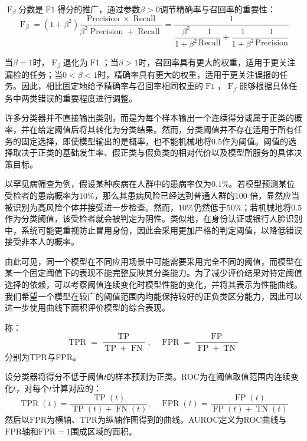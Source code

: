 \begin{definition}
	$\operatorname{F}_{\beta}$分数是$\operatorname{F1}$得分的推广，通过参数$\beta>0$调节精确率与召回率的重要性：
	\begin{equation*}
		\operatorname{F}_{\beta}=(1+\beta^2)\frac{\operatorname{Precision}\times\operatorname{Recall}}{\beta^2\operatorname{Precision}+\operatorname{Recall}}=\dfrac{1}{\dfrac{\beta^2}{1+\beta^2}\dfrac{1}{\operatorname{Recall}}+\dfrac{1}{1+\beta^2}\dfrac{1}{\operatorname{Precision}}}
	\end{equation*}
\end{definition}
\begin{note}
	当$\beta=1$时，$\operatorname{F}_{\beta}$退化为$\operatorname{F1}$；当$\beta>1$时，召回率具有更大的权重，适用于更关注漏检的任务；当$0<\beta<1$时，精确率具有更大的权重，适用于更关注误报的任务。因此，相比固定地给予精确率与召回率相同权重的$\operatorname{F1}$，$\operatorname{F}_{\beta}$能够根据具体任务中两类错误的重要程度进行调整。
\end{note}
许多分类器并不直接输出类别，而是为每个样本输出一个连续得分或属于正类的概率，并在给定阈值后将其转化为分类结果。然而，分类阈值并不存在适用于所有任务的固定选择，即使模型输出的是概率，也不能机械地将$0.5$作为阈值。阈值的选择取决于正类的基础发生率、假正类与假负类的相对代价以及模型所服务的具体决策目标。\par
以罕见病筛查为例，假设某种疾病在人群中的患病率仅为$0.1\%$。若模型预测某位受检者的患病概率为$10\%$，那么其患病风险已经达到普通人群的$100$ 倍，显然应当被识别为高风险个体并接受进一步检查。然而，$10\%$仍然低于$50\%$；若机械地将$0.5$作为分类阈值，该受检者就会被判定为阴性。类似地，在身份认证或银行人脸识别中，系统可能更重视防止冒用身份，因此会采用更加严格的判定阈值，以降低错误接受非本人的概率。\par
由此可见，同一个模型在不同应用场景中可能需要采用完全不同的阈值，而模型在某一个固定阈值下的表现不能完整反映其分类能力。为了减少评价结果对特定阈值选择的依赖，可以考察阈值连续变化时模型性能的变化，并将其表示为性能曲线。我们希望一个模型在较广的阈值范围内均能保持较好的正负类区分能力，因此可以进一步使用曲线下面积评价模型的综合表现。
\begin{definition}
	称：
	 \begin{equation*}
		\operatorname{TPR}=\frac{\operatorname{TP}}{\operatorname{TP}+\operatorname{FN}},\quad\operatorname{FPR}=\frac{\operatorname{FP}}{\operatorname{FP}+\operatorname{TN}}
	\end{equation*}
	分别为\gls{TPR}与\gls{FPR}。
\end{definition}
\begin{definition}
	设分类器将得分不低于阈值$t$的样本预测为正类。\gls{ROC}为在阈值取值范围内连续变化$t$，对每个$t$计算对应的：
	\begin{equation*}
		\operatorname{TPR}(t)=\frac{\operatorname{TP}(t)}{\operatorname{TP}(t)+\operatorname{FN}(t)},\quad\operatorname{FPR}(t)=\frac{\operatorname{FP}(t)}{\operatorname{FP}(t)+\operatorname{TN}(t)}
	\end{equation*}
	然后以$\mathrm{FPR}$为横轴、$\mathrm{TPR}$为纵轴作图得到的曲线。\gls{AUROC}定义为ROC曲线与$\mathrm{FPR}$轴和$\mathrm{FPR}=1$围成区域的面积。
\end{definition}
